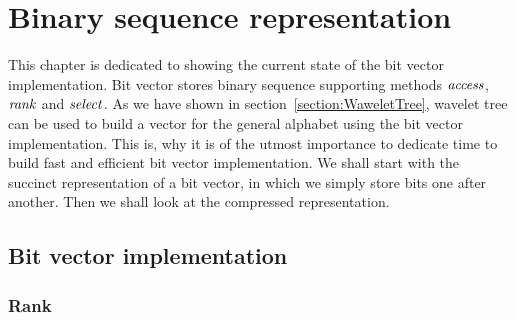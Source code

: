 \chapter{Binary sequence representation}
\label{kap:kap2}

This chapter is dedicated to showing the current state of the bit vector
implementation. Bit vector stores binary sequence supporting methods $\mathit{access}$,
$\mathit{rank}$ and $\mathit{select}$. As we have shown in section~\ref{section:WaweletTree}, wavelet
tree can be used to build a vector for the general alphabet using the bit vector
implementation. This is, why it is of the utmost importance to dedicate time
to build fast and efficient bit vector implementation. We shall start with the
succinct representation of a bit vector, in which we simply store bits one
after another. Then we shall look at the compressed representation.

\section{Bit vector implementation}

\subsection{Rank}
\label{section:rank}


